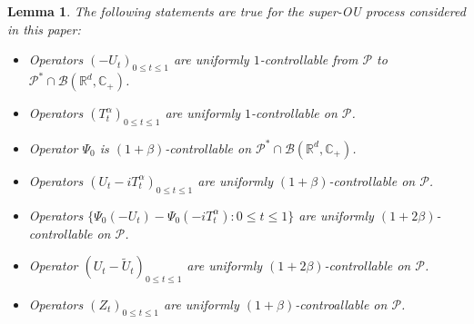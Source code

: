 \documentclass[12pt,oneside,english]{amsart}
\theoremstyle{plain}
\newtheorem{lem}[thm]{Lemma}
\theoremstyle{definition}
\numberwithin{equation}{section}
\begin{document}
\begin{lem}
\label{lem: upper bound for usgx}
The following statements are true for the super-OU process considered in this paper:
\begin{itemize}
\item[(1)]
    Operators $(-U_t)_{0\leq t\leq 1}$ are uniformly $1$-controllable from $\mathcal P$ to $\mathcal P^*\cap \mathcal B(\mathbb R^d, \mathbb C_+)$.
\item[(2)]
    Operators $(T^\alpha_t)_{0\leq t\leq 1}$ are uniformly $1$-controllable on $\mathcal P$.
\item[(3)]
    Operator $\Psi_0$ is $(1+\beta)$-controllable on $\mathcal P^* \cap \mathcal B(\mathbb R^d, \mathbb C_+)$.
\item[(4)]
    Operators $(U_t- iT_t^{\alpha})_{0\leq t\leq 1}$ are uniformly $(1+\beta)$-controllable on $\mathcal P$.
\item[(5)]
    Operators $\{\Psi_0(-U_t) - \Psi_0(-iT_t^\alpha): 0\leq t\leq 1\}$ are uniformly $(1+2\beta)$-controllable on $\mathcal P$.
\item[(6)]
    Operator $(U_t-\tilde U_t)_{0\leq t\leq 1}$ are uniformly $(1+2\beta)$-controllable on $\mathcal P$.
\item[(7)]
    Operators $(Z_t)_{0\leq t\leq 1}$ are uniformly $(1+\beta)$-controallable on $\mathcal P$.
\end{itemize}
\end{lem}
\end{document}
